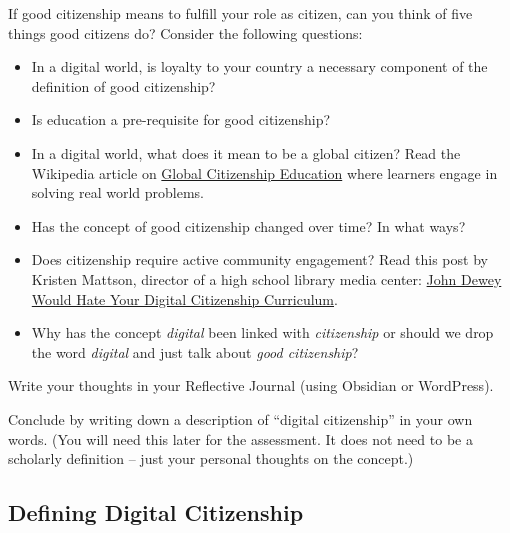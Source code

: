\documentclass[
]{book}
\providecommand{\tightlist}{%
  \setlength{\itemsep}{0pt}\setlength{\parskip}{0pt}}
\theoremstyle{definition}
\theoremstyle{definition}
\theoremstyle{definition}
\theoremstyle{definition}
\theoremstyle{remark}
\begin{document}
\begin{reflect}
If good citizenship means to fulfill your role as citizen, can you think of five things good citizens do? Consider the following questions:

\begin{itemize}
\tightlist
\item
  In a digital world, is loyalty to your country a necessary component of the definition of good citizenship?\\
\item
  Is education a pre-requisite for good citizenship?\\
\item
  In a digital world, what does it mean to be a global citizen? Read the Wikipedia article on \href{https://en.wikipedia.org/wiki/Global_citizenship_education}{Global Citizenship Education} where learners engage in solving real world problems.\\
\item
  Has the concept of good citizenship changed over time? In what ways?\\
\item
  Does citizenship require active community engagement? Read this post by Kristen Mattson, director of a high school library media center: \href{https://drkmattson.wordpress.com/2016/08/03/john-dewey-would-hate-your-digital-citizenship-curriculum/}{John Dewey Would Hate Your Digital Citizenship Curriculum}.\\
\item
  Why has the concept \emph{digital} been linked with \emph{citizenship} or should we drop the word \emph{digital} and just talk about \emph{good citizenship}?
\end{itemize}

Write your thoughts in your Reflective Journal (using Obsidian or WordPress).

Conclude by writing down a description of ``digital citizenship'' in your own words. (You will need this later for the assessment. It does not need to be a scholarly definition -- just your personal thoughts on the concept.)
\end{reflect}

\hypertarget{defining-digital-citizenship}{%
\subsection*{Defining Digital Citizenship}\label{defining-digital-citizenship}}
\end{document}
